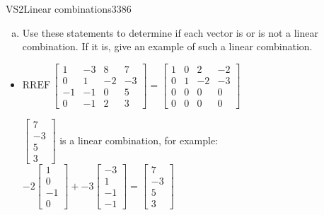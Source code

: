 \begin{exercise}{VS2}{Linear combinations}{3386}
\begin{exerciseStatement}
\begin{enumerate}[(a)]
\begin{itemize}
 
\end{itemize}

     
\item  

 Use these statements to determine if each vector is or is not a linear combination. If it is, give an example of such a linear combination. 

 
\end{enumerate}

     \end{exerciseStatement}
 \begin{exerciseAnswer} 

\begin{itemize}
\item  

 \(
\mathrm{RREF}\, \left[\begin{array}{ccc|c}
1 & -3 & 8 & 7 \\
0 & 1 & -2 & -3 \\
-1 & -1 & 0 & 5 \\
0 & -1 & 2 & 3
\end{array}\right] = \left[\begin{array}{ccc|c}
1 & 0 & 2 & -2 \\
0 & 1 & -2 & -3 \\
0 & 0 & 0 & 0 \\
0 & 0 & 0 & 0
\end{array}\right]
                        \) 

 

 \(\left[\begin{array}{c}
7 \\
-3 \\
5 \\
3
\end{array}\right]\) is a linear combination, for example: \(
-2 \left[\begin{array}{c}
1 \\
0 \\
-1 \\
0
\end{array}\right] + -3 \left[\begin{array}{c}
-3 \\
1 \\
-1 \\
-1
\end{array}\right] = \left[\begin{array}{c}
7 \\
-3 \\
5 \\
3
\end{array}\right]
                            \) 


\end{itemize}
\end{exerciseAnswer}
\end{exercise}
